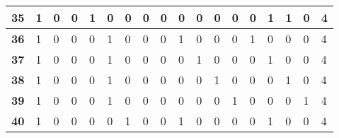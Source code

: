 \begin{center}
\begin{longtable}{|P{0.3cm}|P{0.3cm}|P{0.3cm}|P{0.3cm}|P{0.3cm}|P{0.3cm}|P{0.3cm}|P{0.3cm}|P{0.3cm}|P{0.3cm}|P{0.3cm}|P{0.3cm}|P{0.3cm}|P{0.3cm}|P{0.3cm}|P{0.3cm}|P{0.3cm}|P{1.4cm}|}
\textbf{35}                        & 1                     & 0                     & 0                     & 1                     & 0                     & 0                     & 0                     & 0                     & 0                     & 0                     & 0                     & 0                     & 0                     & 1                     & 1                     & 0                     & 4                     \\ \hline
\textbf{36}                        & 1                     & 0                     & 0                     & 0                     & 1                     & 0                     & 0                     & 0                     & 1                     & 0                     & 0                     & 0                     & 1                     & 0                     & 0                     & 0                     & 4                     \\ \hline
\textbf{37}                        & 1                     & 0                     & 0                     & 0                     & 1                     & 0                     & 0                     & 0                     & 0                     & 1                     & 0                     & 0                     & 0                     & 1                     & 0                     & 0                     & 4                     \\ \hline
\textbf{38}                        & 1                     & 0                     & 0                     & 0                     & 1                     & 0                     & 0                     & 0                     & 0                     & 0                     & 1                     & 0                     & 0                     & 0                     & 1                     & 0                     & 4                     \\ \hline
\textbf{39}                        & 1                     & 0                     & 0                     & 0                     & 1                     & 0                     & 0                     & 0                     & 0                     & 0                     & 0                     & 1                     & 0                     & 0                     & 0                     & 1                     & 4                     \\ \hline
\textbf{40}                        & 1                     & 0                     & 0                     & 0                     & 0                     & 1                     & 0                     & 0                     & 1                     & 0                     & 0                     & 0                     & 0                     & 1                     & 0                     & 0                     & 4                     \\ \hline

\end{longtable}
\end{center}
